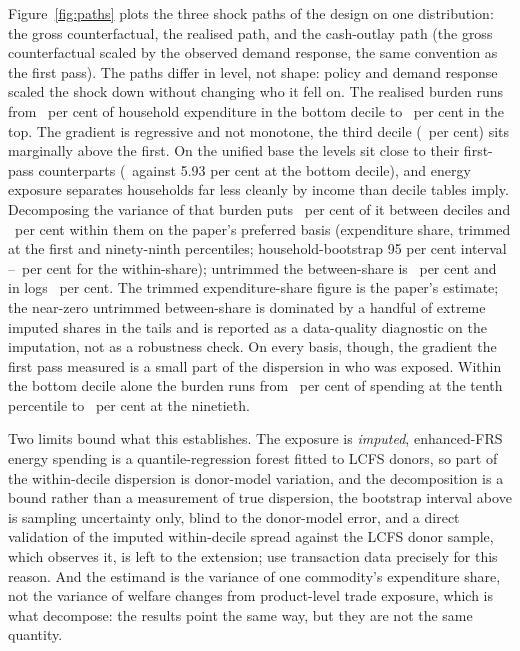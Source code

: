 Figure~\ref{fig:paths} plots the three shock paths of the design on
one distribution: the gross counterfactual, the realised path, and the
cash-outlay path (the gross counterfactual scaled by the observed
demand response, the same convention as the first pass). The paths differ in level, not shape: policy and
demand response scaled the shock down without changing who it fell on.
The realised burden runs from \SsBurdenPctSpendDecOne\ per cent of
household expenditure in the bottom decile to
\SsBurdenPctSpendDecTen\ per cent in the top. The gradient is
regressive and not monotone, the third decile
(\SsBurdenPctSpendDecThree\ per cent) sits marginally above the
first. On the unified base the levels sit close to their first-pass
counterparts (\SsBurdenPctSpendDecOne\ against 5.93 per cent at the
bottom decile), and energy exposure separates households far less
cleanly by income than decile tables imply.
Decomposing the variance of that burden puts
\SsBetweenPct\ per cent of it between deciles and
\SsWithinPct\ per cent within them on the paper's preferred basis
(expenditure share, trimmed at the first and ninety-ninth percentiles;
household-bootstrap 95 per cent interval
\SsWithinLo--\SsWithinHi\ per cent for the within-share);
untrimmed the between-share is \SsBetweenPctUntrimmed\ per cent and in
logs \SsBetweenPctLog\ per cent. The trimmed expenditure-share figure is the paper's estimate; the
near-zero untrimmed between-share is dominated by a handful of extreme
imputed shares in the tails and is reported as a data-quality
diagnostic on the imputation, not as a robustness check. On every
basis, though, the gradient the first pass measured is a small part of
the dispersion in who was exposed. Within the bottom decile alone the burden runs from
\SsPTenDecOne\ per cent of spending at the tenth percentile to
\SsPNinetyDecOne\ per cent at the ninetieth.

Two limits bound what this establishes. The exposure is
\emph{imputed}, enhanced-FRS energy spending is a quantile-regression
forest fitted to LCFS donors, so part of the within-decile dispersion
is donor-model variation, and the decomposition is a bound rather than
a measurement of true dispersion, the bootstrap interval above is
sampling uncertainty only, blind to the donor-model error, and a
direct validation of the imputed within-decile spread against the
LCFS donor sample, which observes it, is left to the extension; \citet{levell2025} use transaction
data precisely for this reason. And the estimand is the variance of one
commodity's expenditure share, not the variance of welfare changes from
product-level trade exposure, which is what
\citet{borusyakjaravel2024} decompose: the results point the same way,
but they are not the same quantity.

